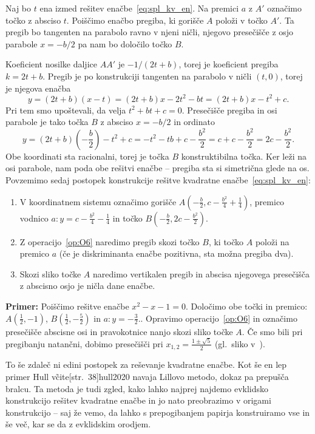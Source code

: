 Naj bo $t$ ena izmed rešitev enačbe~\ref{eq:spl_kv_en}. Na premici $a$ z $A'$ označimo točko z absciso $t$. Poiščimo enačbo pregiba, ki gorišče $A$ položi v točko $A'$. Ta pregib bo tangenten na parabolo ravno v njeni ničli, njegovo presečišče z osjo parabole $ x = -b/2 $ pa nam bo določilo točko $B$.

Koeficient nosilke daljice $AA'$ je $ - 1/(2t + b)$, torej je koeficient pregiba $k = 2t + b$. Pregib je po konstrukciji tangenten na parabolo v ničli $(t, 0)$, torej je njegova enačba
$$ y = (2t + b)(x - t) = (2t + b)x - 2t^2 - bt = (2t + b)x - t^2 + c. $$
Pri tem smo upoštevali, da velja $t^2 + bt + c = 0$. Presečišče pregiba in osi parabole je tako točka $B$ z absciso $ x = -b/2 $ in ordinato
$$ y = (2t + b)\left(-\frac{b}{2}\right) - t^2 + c = - t^2 - tb + c - \frac{b^2}{2} = c + c - \frac{b^2}{2} = 2c - \frac{b^2}{2}.$$
Obe koordinati sta racionalni, torej je točka $B$ konstruktibilna točka. Ker leži na osi parabole, nam poda obe rešitvi enačbe -- pregiba sta si simetrična glede na os. Povzemimo sedaj postopek konstrukcije rešitve kvadratne enačbe~\ref{eq:spl_kv_en}:
\begin{enumerate}
    \item V koordinatnem sistemu označimo gorišče $A\left(-\frac{b}{2}, c - \frac{b^2}{4} + \frac{1}{4}\right)$, premico vodnico $a: y = c - \frac{b^2}{4} - \frac{1}{4}$ in točko $B(-\frac{b}{2}, 2c - \frac{b^2}{2})$.
    \item Z operacijo~\ref{op:O6} naredimo pregib skozi točko $B$, ki točko $A$ položi na premico $a$ (če je diskriminanta enačbe pozitivna, sta možna pregiba dva).
    \item Skozi sliko točke $A$ naredimo vertikalen pregib in abscisa njegovega presečišča z abscisno osjo je ničla dane enačbe.
\end{enumerate}

\textbf{Primer:} Poiščimo rešitve enačbe $x^2 - x - 1 = 0$. Določimo obe točki in premico: $A(\frac{1}{2}, -1)$, $B(\frac{1}{2}, -\frac{5}{2})$ in $a: y = -\frac{3}{2}.$. Opravimo operacijo~\ref{op:O6} in označimo presečišče abscisne osi in pravokotnice nanjo skozi sliko točke $A$. Če smo bili pri pregibanju natančni, dobimo presečišči pri $x_{1,2} = \frac{1 \pm \sqrt{5}}{2}$ (gl.\ sliko v~\cite[str.\ 37]{hull2020}).

To še zdaleč ni edini postopek za reševanje kvadratne enačbe. Kot še en lep primer Hull v\~cite[str.\ 38]{hull2020} navaja Lillovo metodo, dokaz pa prepušča bralcu. Ta metoda je tudi zgled, kako lahko najprej najdemo evklidsko konstrukcijo rešitev kvadratne enačbe in jo nato preobrazimo v origami konstrukcijo -- saj že vemo, da lahko s prepogibanjem papirja konstruiramo vse in še več, kar se da z evklidskim orodjem.

